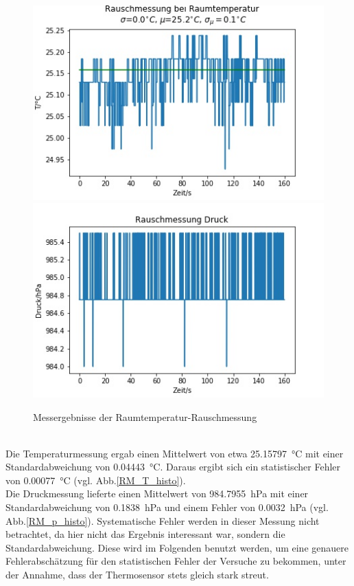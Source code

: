 \documentclass[]{article}
\begin{document}
\begin{figure}[h]
	\begin{center}
		\includegraphics[scale=0.45]{Images/RauschmessungRT_T.jpg}
		\includegraphics[scale=0.45]{Images/RauschmessungRT_p.jpg}
		\caption{Messergebnisse der Raumtemperatur-Rauschmessung}
		\label{RM_T_p}
	\end{center}
\end{figure}\\
Die Temperaturmessung ergab einen Mittelwert von etwa \SI{25.15797}{\celsius} mit einer Standardabweichung von \SI{0.04443}{\celsius}.  Daraus ergibt sich ein statistischer Fehler von \SI{0.00077}{\celsius} (vgl. Abb.\ref{RM_T_histo}).\\
Die Druckmessung lieferte einen Mittelwert von \SI{984.7955}{\hecto \pascal} mit einer Standardabweichung von \SI{0.1838}{\hecto \pascal} und einem Fehler von \SI{0.0032}{\hecto \pascal} (vgl. Abb.\ref{RM_p_histo}).
Systematische Fehler werden in dieser Messung nicht betrachtet, da hier nicht das Ergebnis interessant war, sondern die Standardabweichung. Diese wird im Folgenden benutzt werden, um eine genauere Fehlerabschätzung für den statistischen Fehler der Versuche zu bekommen, unter der Annahme, dass der Thermosensor stets gleich stark streut.
\end{document}
